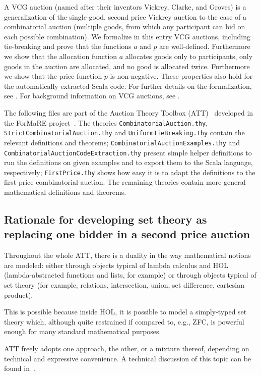 \documentclass[11pt,a4paper]{article}
\begin{document}
A VCG auction (named after their inventors Vickrey, Clarke, and
Groves) is a generalization of the single-good, second price Vickrey
auction to the case of a combinatorial auction (multiple goods, from
which any participant can bid on each possible combination). We
formalize in this entry VCG auctions, including tie-breaking and prove
that the functions $a$ and $p$ are well-defined. Furthermore we show
that the allocation function $a$ allocates goods only to participants,
only goods in the auction are allocated, and no good is allocated
twice. Furthermore we show that the price function $p$ is
non-negative. These properties also hold for the automatically
extracted Scala code. For further details on the formalization, see
\cite{ec15}. For background information on VCG auctions, see \cite{cramton}.

  
The following files are part of the Auction Theory Toolbox
(ATT)~\cite{github} developed in the ForMaRE project~\cite{formare}.
The theories \texttt{CombinatorialAuction.thy},
\texttt{StrictCombinatorialAuction.thy} and
\texttt{UniformTieBreaking.thy} contain the relevant definitions and
theorems; \texttt{CombinatorialAuctionExamples.thy} and
\texttt{CombinatorialAuctionCodeExtraction.thy} present simple helper
definitions to run the definitions on given examples and to export
them to the Scala language, respectively; \texttt{FirstPrice.thy}
shows how easy it is to adapt the definitions to the first price
combinatorial auction.  The remaining theories contain more general
mathematical definitions and theorems.


\subsection{Rationale for developing set theory as replacing one bidder in a second price auction}

Throughout the whole ATT, there is a duality in the way mathematical
notions are modeled: either through objects typical of lambda calculus
and HOL (lambda-abstracted functions and lists, for example) or
through objects typical of set theory (for example, relations,
intersection, union, set difference, cartesian product).

This is possible because inside HOL, it is possible to model a
simply-typed set theory which, although quite restrained if compared
to, e.g., ZFC, is powerful enough for many standard mathematical
purposes.

ATT freely adopts one approach, the other, or a mixture thereof, depending on technical and
expressive convenience.
A technical discussion of this topic can be found in~\cite{cicm2014}.
\end{document}
